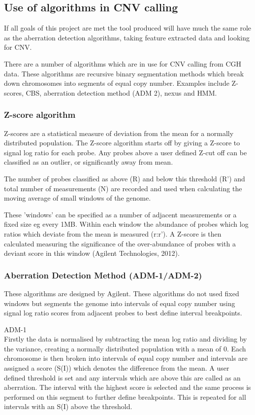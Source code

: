 \subsection{Use of algorithms in \ac{CNV} calling}
If all goals of this project are met the tool produced will have much the same role as the aberration detection algorithms, taking feature extracted data and looking for \ac{CNV}.

There are a number of algorithms which are in use for \ac{CNV} calling from \ac{CGH} data. These algorithms are recursive binary segmentation methods which break down chromosomes into segments of equal copy number. Examples include Z-scores, \ac{CBS}, aberration detection method (ADM 2), nexus and \ac{HMM}. 

\subsubsection{Z-score algorithm}
Z-scores are a statistical measure of deviation from the mean for a normally distributed population. The Z-score algorithm starts off by giving a Z-score to signal log ratio for each probe. Any probes above a user defined Z-cut off can be classified as an outlier, or significantly away from mean. 

The number of probes classified as above (R) and below this threshold (R') and total number of measurements (N) are recorded and used when calculating the moving average of small windows of the genome. 

These 'windows' can be specified as a number of adjacent measurements or a fixed size eg every 1MB. Within each window the abundance of probes which log ratios which deviate from the mean is measured (r:r').
A Z-score is then calculated measuring the significance of the over-abundance of probes with a deviant score in this window (Agilent Technologies, 2012).

\subsubsection{Aberration Detection Method (ADM-1/ADM-2)}
These algorithms are designed by Agilent. These algorithms do not used fixed windows but segments the genome into intervals of equal copy number using signal log ratio scores from adjacent probes to best define interval breakpoints.

ADM-1\\
 Firstly the data is normalised by subtracting the mean log ratio and dividing by the variance, creating a normally distributed population with a mean of 0. 
Each chromosome is then broken into intervals of equal copy number and intervals are assigned a score (S(I)) which denotes the difference from the mean. A user defined threshold is set and any intervals which are above this are called as an aberration.
The interval with the highest score is selected and the same process is performed on this segment to further define breakpoints. This is repeated for all intervals with an S(I) above the threshold.

